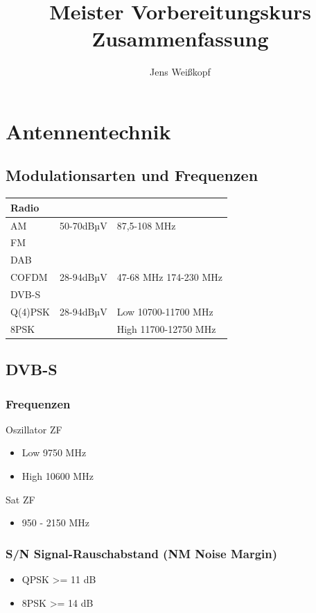 \documentclass[12pt,a4paper]{article}
\author{Jens Weißkopf}
\title{Meister Vorbereitungskurs Zusammenfassung}
\begin{document}
\maketitle
\pagebreak
\tableofcontents
\pagebreak
\section{Antennentechnik}
\subsection{Modulationsarten und Frequenzen}
\begin{tabular}{|l|l|l|}
\hline
\multicolumn{3}{|l|}{Radio}\\
\hline
AM & 50-70dBµV & 87,5-108 MHz \\
FM &  &  \\
\hline
\hline
\multicolumn{3}{|l|}{DAB}\\
\hline
COFDM & 28-94dBµV & 47-68 MHz 174-230 MHz \\
\hline
\hline
\multicolumn{3}{|l|}{DVB-S}\\
\hline
Q(4)PSK & 28-94dBµV & Low 10700-11700 MHz \\
8PSK & & High 11700-12750 MHz \\
\hline
\end{tabular}

\subsection{DVB-S}
\subsubsection{Frequenzen}
Oszillator ZF
\begin{itemize}
\item Low 9750 MHz
\item High 10600 MHz
\end{itemize}
Sat ZF
\begin{itemize}
\item 950 - 2150 MHz
\end{itemize}

\subsubsection{S/N Signal-Rauschabstand (NM Noise Margin)}
\begin{itemize}
\item QPSK >= 11 dB
\item 8PSK >= 14 dB
\end{itemize}
\end{document}
